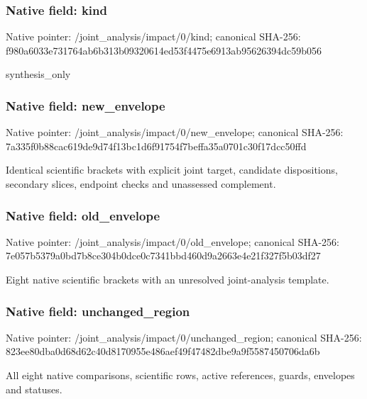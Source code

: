 \documentclass[10pt,a4paper]{article}
\begin{document}
\subsubsection{Native field: kind}
Native pointer: /joint\_\allowbreak{}analysis/impact/0/kind; canonical SHA-256: f980a6033e731764ab6b313b09320614ed53f4475e6913ab95626394dc59b056

\begingroup\raggedright\sloppy synthesis\_\allowbreak{}only\par\endgroup

\subsubsection{Native field: new\_\allowbreak{}envelope}
Native pointer: /joint\_\allowbreak{}analysis/impact/0/new\_\allowbreak{}envelope; canonical SHA-256: 7a335f0b88cac619de9d74f13bc1d6f91754f7beffa35a0701c30f17dcc50ffd

\begingroup\raggedright\sloppy Identical scientific brackets with explicit joint target,\allowbreak{} candidate dispositions,\allowbreak{} secondary slices,\allowbreak{} endpoint checks and unassessed complement.\par\endgroup

\subsubsection{Native field: old\_\allowbreak{}envelope}
Native pointer: /joint\_\allowbreak{}analysis/impact/0/old\_\allowbreak{}envelope; canonical SHA-256: 7e057b5379a0bd7b8ce304b0dce0c7341bbd460d9a2663e4e21f327f5b03df27

\begingroup\raggedright\sloppy Eight native scientific brackets with an unresolved joint-analysis template.\par\endgroup

\subsubsection{Native field: unchanged\_\allowbreak{}region}
Native pointer: /joint\_\allowbreak{}analysis/impact/0/unchanged\_\allowbreak{}region; canonical SHA-256: 823ee80dba0d68d62c40d8170955e486aef49f47482dbe9a9f5587450706da6b

\begingroup\raggedright\sloppy All eight native comparisons,\allowbreak{} scientific rows,\allowbreak{} active references,\allowbreak{} guards,\allowbreak{} envelopes and statuses.\par\endgroup
\end{document}
